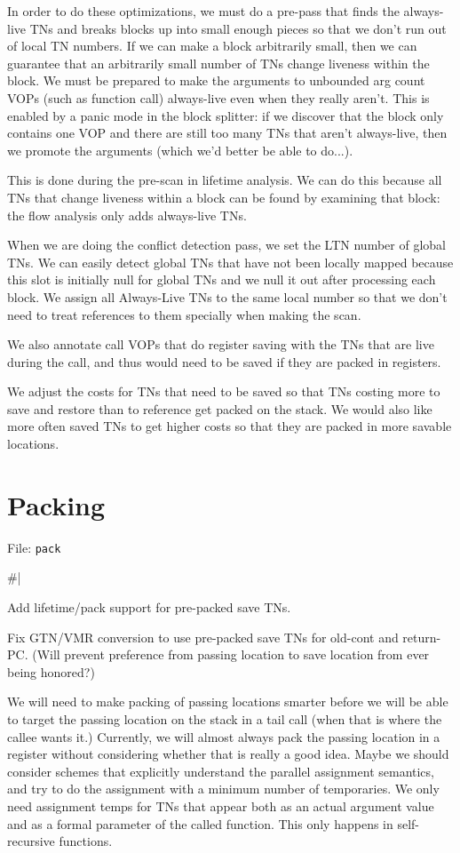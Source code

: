 In order to do these optimizations, we must do a pre-pass that finds the
always-live TNs and breaks blocks up into small enough pieces so that we don't
run out of local TN numbers.  If we can make a block arbitrarily small, then we
can guarantee that an arbitrarily small number of TNs change liveness within
the block.  We must be prepared to make the arguments to unbounded arg count
VOPs (such as function call) always-live even when they really aren't.  This is
enabled by a panic mode in the block splitter: if we discover that the block
only contains one VOP and there are still too many TNs that aren't always-live,
then we promote the arguments (which we'd better be able to do...).

This is done during the pre-scan in lifetime analysis.  We can do this because
all TNs that change liveness within a block can be found by examining that
block: the flow analysis only adds always-live TNs.


When we are doing the conflict detection pass, we set the LTN number of global
TNs.  We can easily detect global TNs that have not been locally mapped because
this slot is initially null for global TNs and we null it out after processing
each block.  We assign all Always-Live TNs to the same local number so that we
don't need to treat references to them specially when making the scan.

We also annotate call VOPs that do register saving with the TNs that are live
during the call, and thus would need to be saved if they are packed in
registers.

We adjust the costs for TNs that need to be saved so that TNs costing more to
save and restore than to reference get packed on the stack.  We would also like
more often saved TNs to get higher costs so that they are packed in more
savable locations.

\chapter{Packing}

File: {\tt pack}

\#|

Add lifetime/pack support for pre-packed save TNs.

Fix GTN/VMR conversion to use pre-packed save TNs for old-cont and return-PC.
(Will prevent preference from passing location to save location from ever being
honored?)

We will need to make packing of passing locations smarter before we will be
able to target the passing location on the stack in a tail call (when that is
where the callee wants it.)  Currently, we will almost always pack the passing
location in a register without considering whether that is really a good idea.
Maybe we should consider schemes that explicitly understand the parallel
assignment semantics, and try to do the assignment with a minimum number of
temporaries.  We only need assignment temps for TNs that appear both as an
actual argument value and as a formal parameter of the called function.  This
only happens in self-recursive functions.

